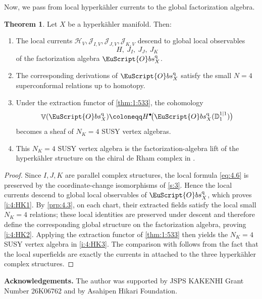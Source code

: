 \documentclass[final,reqno]{amsart}
\numberwithin{equation}{section}
\newenvironment{Ack}%
{\par \vspace{\baselineskip}%
 \noindent \textbf{Acknowledgements.}}%
{\par \vspace{\baselineskip}}
\theoremstyle{definition}
\newtheorem{thm}{Theorem}[section]
\newcommand{\bl}{\bullet}
\newcommand{\ceq}{\coloneqq} %
\newcommand{\q}{\textup{q}}
\newcommand{\sD}{\mathbb{D}^{1|1}}
\newcommand{\clH}{\mathcal{H}}
\newcommand{\clJ}{\mathcal{J}}
\newcommand{\sqObs}[1]{\mathop{\EuScript{O}bs^{\q}_{#1}}}
\DeclareMathOperator{\bbV}{\mathbb{V}}
\begin{document}
Now, we pass from local hyperk\"ahler currents to 
the global factorization algebra.

\begin{thm}\label{thm:4:N=4}
Let $X$ be a hyperk\"ahler manifold. Then:
\begin{enumerate}
\item \label{i:4:HK1}
The local currents $\clH_V,\clJ_{I,V},\clJ_{J,V},\clJ_{K,V}$
descend to global local observables
\[
 H,\ J_I,\ J_J,\ J_K
\]
of the factorization algebra $\sqObs{X}$.

\item \label{i:4:HK2}
The corresponding derivations of $\sqObs{X}$ satisfy the small
$N=4$ superconformal relations up to homotopy.

\item \label{i:4:HK3}
Under the extraction functor of \cref{thm:1:533}, the cohomology
\[
 \bbV(\sqObs{X}) \ceq H^{\bl}\!\bigl(\sqObs{X}(\sD_1)\bigr)
\]
becomes a sheaf of $N_K=4$ SUSY vertex algebras.

\item 
This $N_K=4$ SUSY vertex algebra is the factorization-algebra lift of
the hyperk\"ahler structure on the chiral de Rham complex 
in \cite[Theorem 7.4 (iii)]{BHS}.
\end{enumerate}
\end{thm}

\begin{proof}
Since $I,J,K$ are parallel complex structures, 
the local formula \cref{eq:4.6} is preserved by 
the coordinate-change isomorphisms of \cref{s:3}.
Hence the local currents descend to global local observables of $\sqObs{X}$,
which proves \ref{i:4:HK1}.
By \cref{prp:4.3}, on each chart, 
their extracted fields satisfy the local small $N_K=4$ relations; 
these local identities are preserved under descent and 
therefore define the corresponding global structure 
on the factorization algebra, proving \ref{i:4:HK2}. 
Applying the extraction functor of \cref{thm:1:533} 
then yields the $N_K=4$ SUSY vertex algebra in \ref{i:4:HK3}. 
The comparison with \cite[\S7]{BHS} follows from the fact 
that the local superfields are exactly the currents 
in \cite[Theorem 7.4 (iii)]{BHS}
attached to the three hyperk\"ahler complex structures.
\end{proof}

\begin{Ack}
The author was supported by JSPS KAKENHI Grant Number 26K06762 
and by Asahipen Hikari Foundation.
\end{Ack}
\end{document}
